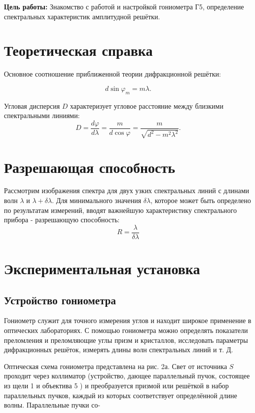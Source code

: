 \documentclass[a4paper,12pt]{article} %
\begin{document}
\textbf{Цель работы:} Знакомство с работой и настройкой гониометра Г5, определение спектральных характеристик амплитудной решётки.



\section{Теоретическая справка}

Основное соотношение приближенной теории дифракционной решётки:

	\begin{equation}
	d\sin \varphi_m = m\lambda.
 \label{main}
	\end{equation}
 
Угловая дисперсия $D$ характеризует угловое расстояние между близкими спектральными линиями:
	\begin{equation}
	D = \frac{d\varphi}{d\lambda} = \frac{m}{d \cos \varphi}=\frac{m}{\sqrt{d^{2}-m^{2} \lambda^{2}}}.
	\end{equation}
\section{Разрешающая способность}
Рассмотрим изображения спектра для двух узких спектральных линий с длинами волн $\lambda$ и $\lambda + \delta\lambda$. Для минимального значения $\delta\lambda$, которое может быть определено по результатам измерений, вводят важнейшую характеристику спектрального прибора - разрешающую способность:
\begin{equation}
R = \frac{\lambda}{\delta\lambda}
\end{equation}
\section{Экспериментальная установка}

\subsection{Устройство гониометра}

Гониометр служит для точного измерения углов и находит широкое применение в оптических лабораториях. С помощью гониометра можно определять показатели преломления и преломляющие углы призм и кристаллов, исследовать параметры дифракционных решёток, измерять длины волн спектральных линий и т. Д.

Оптическая схема гониометра представлена на рис. 2а. Свет от источника $S$ проходит через коллиматор (устройство, дающее параллельный пучок, состоящее из щели 1 и объектива 5 ) и преобразуется призмой или решёткой в набор параллельных пучков, каждый из которых соответствует определённой длине волны. Параллельные пучки со-
\end{document}
